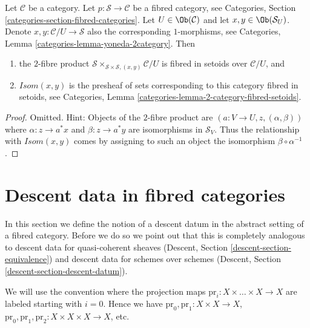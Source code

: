 \begin{lemma}
\label{lemma-isom-as-2-fibre-product}
Let $\mathcal{C}$ be a category.
Let $p : \mathcal{S} \to \mathcal{C}$ be a fibred category,
see Categories, Section \ref{categories-section-fibred-categories}.
Let $U \in \Ob(\mathcal{C})$ and let $x, y \in \Ob(\mathcal{S}_U)$.
Denote $x, y : \mathcal{C}/U \to \mathcal{S}$ also the corresponding
$1$-morphisms, see
Categories, Lemma \ref{categories-lemma-yoneda-2category}.
Then
\begin{enumerate}
\item the $2$-fibre product
$\mathcal{S} \times_{\mathcal{S} \times \mathcal{S}, (x, y)} \mathcal{C}/U$
is fibred in setoids over $\mathcal{C}/U$, and
\item $\mathit{Isom}(x, y)$ is the presheaf of sets corresponding
to this category fibred in setoids, see
Categories, Lemma \ref{categories-lemma-2-category-fibred-setoids}.
\end{enumerate}
\end{lemma}

\begin{proof}
Omitted. Hint: Objects of the $2$-fibre product are
$(a : V \to U, z, (\alpha, \beta))$ where
$\alpha : z \to a^*x$ and $\beta : z \to a^*y$ are isomorphisms
in $\mathcal{S}_V$. Thus the relationship with $\mathit{Isom}(x, y)$
comes by assigning to such an object the isomorphism
$\beta \circ \alpha^{-1}$.
\end{proof}







\section{Descent data in fibred categories}
\label{section-descent-data}

\noindent
In this section we define the notion of a descent datum
in the abstract setting of a fibred category. Before we
do so we point out that this is completely analogous to
descent data for quasi-coherent sheaves
(Descent, Section \ref{descent-section-equivalence})
and descent data for schemes over schemes
(Descent, Section \ref{descent-section-descent-datum}).

\medskip\noindent
We will use the convention where the projection maps
$\text{pr}_i : X \times \ldots \times X \to X$
are labeled starting with $i = 0$. Hence we have
$\text{pr}_0, \text{pr}_1 : X \times X  \to X$,
$\text{pr}_0, \text{pr}_1, \text{pr}_2 : X \times X \times X  \to X$,
etc.

